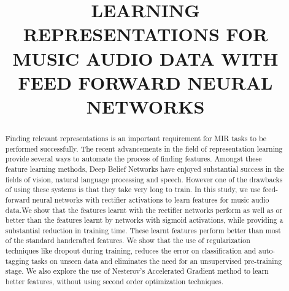 \documentclass{article}
\title{LEARNING REPRESENTATIONS FOR MUSIC AUDIO DATA WITH FEED FORWARD NEURAL NETWORKS}
\begin{document}
%
\maketitle
%
\begin{abstract}
Finding relevant representations is an important requirement for MIR tasks to be performed successfully. The recent advancements in the field of representation learning provide several ways to automate the process of finding features. Amongst these feature learning methods, Deep Belief Networks have enjoyed substantial success in the fields of vision, natural language processing and speech. However one of the drawbacks of using these systems is that they take very long to train. In this study, we use feed-forward neural networks with rectifier activations to learn features for music audio data.We show that the features learnt with the rectifier networks perform as well as or better than the features learnt by networks with sigmoid activations, while providing a substantial reduction in training time. These learnt features perform better than most of the standard handcrafted features. We show that the use of regularization techniques like dropout during training, reduces the error on classification and auto-tagging tasks on unseen data and eliminates the need for an unsupervised pre-training stage. We also explore the use of Nesterov's Accelerated Gradient method to learn better features, without using second order optimization techniques.


\end{abstract}
\end{document}
